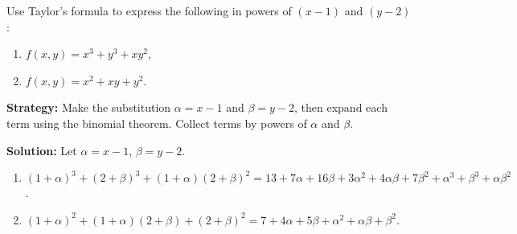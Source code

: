 \begin{problembox}
Use Taylor's formula to express the following in powers of \( (x - 1) \) and \( (y - 2) \):
\begin{enumerate}[label=(\alph*)]
\item \( f(x, y) = x^3 + y^3 + xy^2 \),
\item \( f(x, y) = x^2 + xy + y^2 \).
\end{enumerate}
\end{problembox}

\noindent\textbf{Strategy:} Make the substitution \( \alpha = x - 1 \) and \( \beta = y - 2 \), then expand each term using the binomial theorem. Collect terms by powers of \( \alpha \) and \( \beta \).

\bigskip\noindent\textbf{Solution:}
Let $\alpha=x-1$, $\beta=y-2$.
\begin{enumerate}[label=(\alph*)]
\item $(1+\alpha)^3+(2+\beta)^3+(1+\alpha)(2+\beta)^2=13+7\alpha+16\beta+3\alpha^2+4\alpha\beta+7\beta^2+\alpha^3+\beta^3+\alpha\beta^2$.
\item $(1+\alpha)^2+(1+\alpha)(2+\beta)+(2+\beta)^2=7+4\alpha+5\beta+\alpha^2+\alpha\beta+\beta^2$.
\end{enumerate}